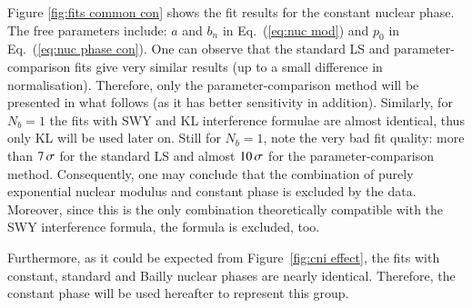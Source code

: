 Figure \ref{fig:fits common con} shows the fit results for the constant nuclear phase. The free parameters include: $a$ and $b_n$ in Eq.~(\ref{eq:nuc mod}) and $p_0$ in Eq.~(\ref{eq:nuc phase con}). One can observe that the standard LS and parameter-comparison fits give very similar results (up to a small difference in normalisation). Therefore, only the parameter-comparison method will be presented in what follows (as it has better sensitivity in addition). Similarly, for $N_b = 1$ the fits with SWY and KL interference formulae are almost identical, thus only KL will be used later on. Still for $N_b = 1$, note the very bad fit quality: more than $7\,{\rm \sigma}$ for the standard LS and almost $10\,{\rm \sigma}$ for the parameter-comparison method. Consequently, one may conclude that the combination of purely exponential nuclear modulus and constant phase is excluded by the data. Moreover, since this is the only combination theoretically compatible with the SWY interference formula, the formula is excluded, too.

Furthermore, as it could be expected from Figure~\ref{fig:cni effect}, the fits with constant, standard and Bailly nuclear phases are nearly identical. Therefore, the constant phase will be used hereafter to represent this group.


